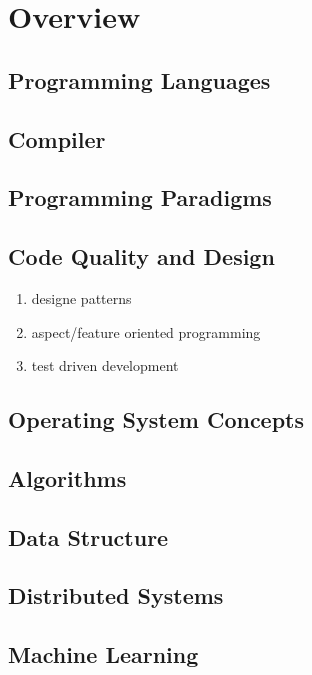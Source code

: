 \documentclass{article}
\begin{document}
\tableofcontents
\newpage

\section{Overview}
\subsection{Programming Languages}
\subsection{Compiler}
\subsection{Programming Paradigms}
\subsection{Code Quality and Design}
\begin{enumerate}
    \item designe patterns
    \item aspect/feature oriented programming
    \item test driven development
\end{enumerate}
\subsection{Operating System Concepts}
\subsection{Algorithms}
\subsection{Data Structure}
\subsection{Distributed Systems}
\subsection{Machine Learning}



\end{document}
